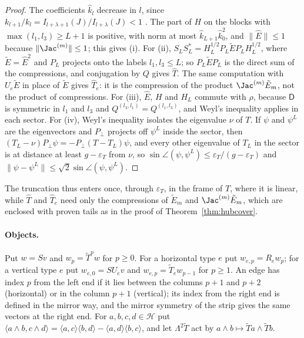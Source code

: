 \begin{proof}
The coefficients $\hat k_l$ decrease in $l$, since $k_{l+1}/k_l=I_{l+\lambda+1}(J)/I_{l+\lambda}(J)<1$ \cite[(16)]{Am74}. The part of $H$ on the blocks
with $\max(l_1,l_3)\ge L+1$ is positive, with norm at most $\hat k_{L+1}\hat k_0^2$, and $\|\hat E\|\le1$ because $\|\Jac^{(m)}\|\le1$; this gives (i). For
(ii), $S_LS_L^*=H_L^{1/2}P_L\tilde EP_LH_L^{1/2}$, where $\tilde E=\hat E^2$ and $P_L$ projects onto the labels $l_1,l_3\le L$; so $P_L\tilde EP_L$ is the direct
sum of the compressions, and conjugation by $Q$ gives $\hat T$. The same computation with $U_e\tilde E$ in place of $\tilde E$ gives $\hat T_e$: it is the
compression of the product $\Jac^{(m)}\tilde E_m$, not the product of compressions. For (iii), $\hat E$, $H$ and $H_L$ commute with $\rho$, because
$\mathsf D$ is symmetric in $l_1$ and $l_3$ and $Q^{(l_3,l_1)}=Q^{(l_1,l_3)}$, and Weyl's inequality applies in each sector. For (iv), Weyl's inequality
isolates the eigenvalue $\nu$ of $T$. If $\psi$ and $\psi^L$ are the eigenvectors and $P_\perp$ projects off $\psi^L$ inside the sector, then
$(T_L-\nu)P_\perp\psi=-P_\perp(T-T_L)\psi$, and every other eigenvalue of $T_L$ in the sector is at distance at least $g-\varepsilon_T$ from $\nu$, so
$\sin\angle(\psi,\psi^L)\le\varepsilon_T/(g-\varepsilon_T)$ and $\|\psi-\psi^L\|\le\sqrt2\sin\angle(\psi,\psi^L)$.
\end{proof}

\noindent The truncation thus enters once, through $\varepsilon_T$, in the frame of $T$, where it is linear, while $\hat T$ and $\hat T_e$ need only the
compressions of $\tilde E_m$ and $\Jac^{(m)}\tilde E_m$, which are enclosed with proven tails as in the proof of Theorem~\ref{thm:hubcover}.

\paragraph{Objects.}
Put $w=Sv$ and $w_p=\tilde T^pw$ for $p\ge0$. For a horizontal type $e$ put $w_{e,p}=R_ew_p$; for a vertical type $e$ put $w_{e,0}=SU_ev$ and
$w_{e,p}=\tilde T_ew_{p-1}$ for $p\ge1$. An edge has index $p$ from the left end if it lies between the columns $p+1$ and $p+2$ (horizontal) or in the
column $p+1$ (vertical); its index from the right end is defined in the mirror way, and the mirror symmetry of the strip gives the same vectors at the
right end. For $a,b,c,d\in\mathcal H$ put $\langle a\wedge b,c\wedge d\rangle=\langle a,c\rangle\langle b,d\rangle-\langle a,d\rangle\langle b,c\rangle$, and
let $\Lambda^2\tilde T$ act by $a\wedge b\mapsto\tilde Ta\wedge\tilde Tb$.

